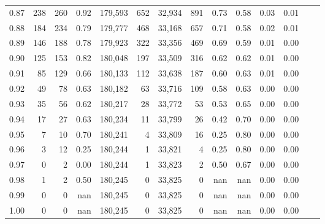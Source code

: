 \begin{tabular}{rrrrrrrrrrrrrr}
0.87 &    238 &  260 &    0.92 &  179,593 &      652 &  32,934 &     891 &  0.73 &  0.58 &  0.03 &      0.01 \\
0.88 &    184 &  234 &    0.79 &  179,777 &      468 &  33,168 &     657 &  0.71 &  0.58 &  0.02 &      0.01 \\
0.89 &    146 &  188 &    0.78 &  179,923 &      322 &  33,356 &     469 &  0.69 &  0.59 &  0.01 &      0.00 \\
0.90 &    125 &  153 &    0.82 &  180,048 &      197 &  33,509 &     316 &  0.62 &  0.62 &  0.01 &      0.00 \\
0.91 &     85 &  129 &    0.66 &  180,133 &      112 &  33,638 &     187 &  0.60 &  0.63 &  0.01 &      0.00 \\
0.92 &     49 &   78 &    0.63 &  180,182 &       63 &  33,716 &     109 &  0.58 &  0.63 &  0.00 &      0.00 \\
0.93 &     35 &   56 &    0.62 &  180,217 &       28 &  33,772 &      53 &  0.53 &  0.65 &  0.00 &      0.00 \\
0.94 &     17 &   27 &    0.63 &  180,234 &       11 &  33,799 &      26 &  0.42 &  0.70 &  0.00 &      0.00 \\
0.95 &      7 &   10 &    0.70 &  180,241 &        4 &  33,809 &      16 &  0.25 &  0.80 &  0.00 &      0.00 \\
0.96 &      3 &   12 &    0.25 &  180,244 &        1 &  33,821 &       4 &  0.25 &  0.80 &  0.00 &      0.00 \\
0.97 &      0 &    2 &    0.00 &  180,244 &        1 &  33,823 &       2 &  0.50 &  0.67 &  0.00 &      0.00 \\
0.98 &      1 &    2 &    0.50 &  180,245 &        0 &  33,825 &       0 &   nan &   nan &  0.00 &      0.00 \\
0.99 &      0 &    0 &     nan &  180,245 &        0 &  33,825 &       0 &   nan &   nan &  0.00 &      0.00 \\
1.00 &      0 &    0 &     nan &  180,245 &        0 &  33,825 &       0 &   nan &   nan &  0.00 &      0.00 \\
\bottomrule
\end{tabular}
